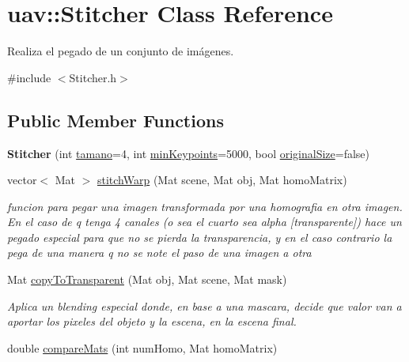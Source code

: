 \hypertarget{classuav_1_1Stitcher}{}\section{uav\+:\+:Stitcher Class Reference}
\label{classuav_1_1Stitcher}


Realiza el pegado de un conjunto de imágenes.  




{\ttfamily \#include $<$Stitcher.\+h$>$}

\subsection*{Public Member Functions}
\begin{DoxyCompactItemize}
\item 
\mbox{\label{classuav_1_1Stitcher_ac106b49de9c5d1162ff97a0f6d96d59c}} 
{\bfseries Stitcher} (int \mbox{\hyperlink{classuav_1_1Stitcher_aecfe8592eb3d8445c0f3e8b722558acb}{tamano}}=4, int \mbox{\hyperlink{classuav_1_1Stitcher_a3b54e9be9bda44c4a04b14a645bd9521}{min\+Keypoints}}=5000, bool \mbox{\hyperlink{classuav_1_1Stitcher_a222f8247abb4fafba61d86078d8f9c16}{original\+Size}}=false)
\item 
vector$<$ Mat $>$ \mbox{\hyperlink{classuav_1_1Stitcher_a096e8020a5544325400743836c8ba58d}{stitch\+Warp}} (Mat scene, Mat obj, Mat homo\+Matrix)
\begin{DoxyCompactList}\small\item\em funcion para pegar una imagen transformada por una homografia en otra imagen. En el caso de q tenga 4 canales (o sea el cuarto sea alpha \mbox{[}transparente\mbox{]}) hace un pegado especial para que no se pierda la transparencia, y en el caso contrario la pega de una manera q no se note el paso de una imagen a otra \end{DoxyCompactList}\item 
Mat \mbox{\hyperlink{classuav_1_1Stitcher_a16bfb7a49f1e3a9c38ef03d72969094d}{copy\+To\+Transparent}} (Mat obj, Mat scene, Mat mask)
\begin{DoxyCompactList}\small\item\em Aplica un blending especial donde, en base a una mascara, decide que valor van a aportar los pixeles del objeto y la escena, en la escena final. \end{DoxyCompactList}\item 
double \mbox{\hyperlink{classuav_1_1Stitcher_a0745fd6db5669c1f9bce1b637c2be163}{compare\+Mats}} (int num\+Homo, Mat homo\+Matrix)

\end{DoxyCompactItemize}
